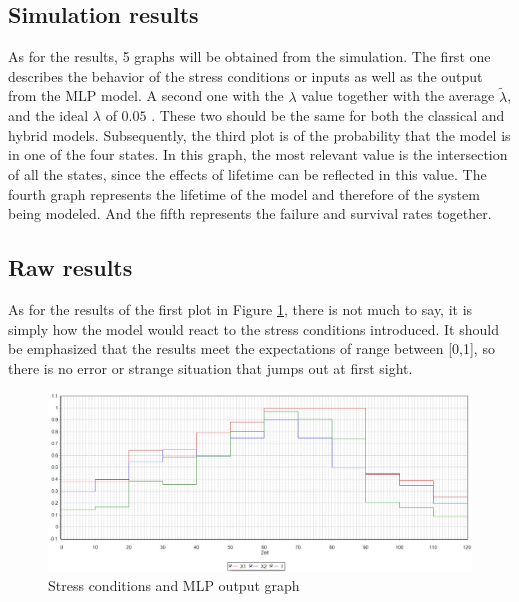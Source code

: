 \documentclass{article}
\begin{document}
\begin{doublespacing}
\newpage

\section{Simulation results}

\par As for the results, 5 graphs will be obtained from the simulation. The first one describes the behavior of the stress conditions or inputs as well as the output from the MLP model. A second one with the $\lambda$ value together with the average $\tilde{\lambda}$, and the ideal $\lambda$ of $0.05$ . These two should be the same for both the classical and hybrid models. Subsequently, the third plot is of the probability that the model is in one of the four states. In this graph, the most relevant value is the intersection of all the states, since the effects of lifetime can be reflected in this value. The fourth graph represents the lifetime of the model and therefore of the system being modeled. And the fifth represents the failure and survival rates together.

\subsection{Raw results}

\par As for the results of the first plot in Figure \ref{fig:MLPOutput}, there is not much to say, it is simply how the model would react to the stress conditions introduced. It should be emphasized that the results meet the expectations of range between [0,1], so there is no error or strange situation that jumps out at first sight.

\begin{figure}[H] 
    \centering
    \includegraphics[width=1.0\textwidth]{Images/MLPOutput.JPG} 
    \caption{Stress conditions and MLP output graph} 
    \label{fig:MLPOutput} 
\end{figure}


\end{doublespacing}
\end{document}
